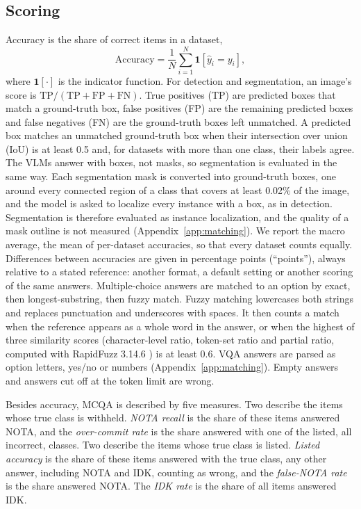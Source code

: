 \documentclass[10pt,letterpaper]{article}
\begin{document}
\subsection{Scoring}
\label{sec:metrics}
Accuracy is the share of correct items in a dataset,
\begin{equation}
  \text{Accuracy} = \frac{1}{N} \sum_{i=1}^{N} \mathbf{1}[\hat{y}_i = y_i],
\end{equation}
where $\mathbf{1}[\cdot]$ is the indicator function. For detection and segmentation, an image's score is $\text{TP}/(\text{TP}+\text{FP}+\text{FN})$. True positives (TP) are predicted boxes that match a ground-truth box, false positives (FP) are the remaining predicted boxes and false negatives (FN) are the ground-truth boxes left unmatched. A predicted box matches an unmatched ground-truth box when their intersection over union (IoU) is at least 0.5 and, for datasets with more than one class, their labels agree. The VLMs answer with boxes, not masks, so segmentation is evaluated in the same way. Each segmentation mask is converted into ground-truth boxes, one around every connected region of a class that covers at least 0.02\% of the image, and the model is asked to localize every instance with a box, as in detection. Segmentation is therefore evaluated as instance localization, and the quality of a mask outline is not measured (Appendix~\ref{app:matching}). We report the macro average, the mean of per-dataset accuracies, so that every dataset counts equally. Differences between accuracies are given in percentage points (``points''), always relative to a stated reference: another format, a default setting or another scoring of the same answers. Multiple-choice answers are matched to an option by exact, then longest-substring, then fuzzy match. Fuzzy matching lowercases both strings and replaces punctuation and underscores with spaces. It then counts a match when the reference appears as a whole word in the answer, or when the highest of three similarity scores (character-level ratio, token-set ratio and partial ratio, computed with RapidFuzz 3.14.6 \cite{bachmann_rapidfuzz_2026}) is at least 0.6. VQA answers are parsed as option letters, yes/no or numbers (Appendix~\ref{app:matching}). Empty answers and answers cut off at the token limit are wrong.

Besides accuracy, MCQA is described by five measures. Two describe the items whose true class is withheld. \emph{NOTA recall} is the share of these items answered NOTA, and the \emph{over-commit rate} is the share answered with one of the listed, all incorrect, classes. Two describe the items whose true class is listed. \emph{Listed accuracy} is the share of these items answered with the true class, any other answer, including NOTA and IDK, counting as wrong, and the \emph{false-NOTA rate} is the share answered NOTA. The \emph{IDK rate} is the share of all items answered IDK.
\end{document}
